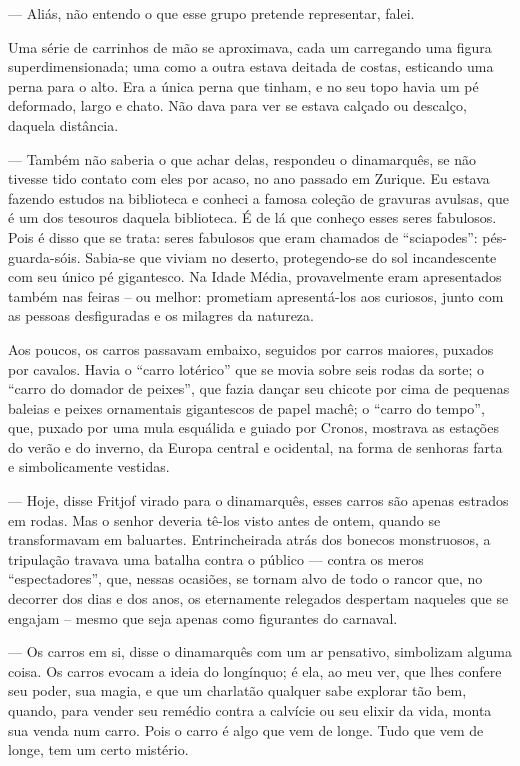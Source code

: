 --- Aliás, não entendo o que esse grupo pretende representar, falei.

Uma série de carrinhos de mão se aproximava, cada um carregando uma
figura superdimensionada; uma como a outra estava deitada de costas,
esticando uma perna para o alto. Era a única perna que tinham, e no seu
topo havia um pé deformado, largo e chato. Não dava para ver se estava
calçado ou descalço, daquela distância.

--- Também não saberia o que achar delas, respondeu o dinamarquês, se não
tivesse tido contato com eles por acaso, no ano passado em Zurique. Eu
estava fazendo estudos na biblioteca e conheci a famosa coleção de
gravuras avulsas, que é um dos tesouros daquela biblioteca. É de lá que
conheço esses seres fabulosos. Pois é disso que se trata: seres
fabulosos que eram chamados de ``sciapodes'': pés-guarda-sóis. Sabia-se
que viviam no deserto, protegendo-se do sol incandescente com seu único
pé gigantesco. Na Idade Média, provavelmente eram apresentados também
nas feiras -- ou melhor: prometiam apresentá-los aos curiosos, junto com
as pessoas desfiguradas e os milagres da natureza.

Aos poucos, os carros passavam embaixo, seguidos por carros maiores,
puxados por cavalos. Havia o ``carro lotérico'' que se movia sobre seis
rodas da sorte; o ``carro do domador de peixes'', que fazia dançar seu
chicote por cima de pequenas baleias e peixes ornamentais gigantescos de
papel machê; o ``carro do tempo'', que, puxado por uma mula esquálida e
guiado por Cronos, mostrava as estações do verão e do inverno, da Europa
central e ocidental, na forma de senhoras farta e simbolicamente
vestidas.

--- Hoje, disse Fritjof virado para o dinamarquês, esses carros são
apenas estrados em rodas. Mas o senhor deveria tê-los visto antes de
ontem, quando se transformavam em baluartes. Entrincheirada atrás dos
bonecos monstruosos, a tripulação travava uma batalha contra o público
--- contra os meros ``espectadores'', que, nessas ocasiões, se tornam
alvo de todo o rancor que, no decorrer dos dias e dos anos, os
eternamente relegados despertam naqueles que se engajam -- mesmo que
seja apenas como figurantes do carnaval.

--- Os carros em si, disse o dinamarquês com um ar pensativo, simbolizam
alguma coisa. Os carros evocam a ideia do longínquo; é ela, ao meu ver,
que lhes confere seu poder, sua magia, e que um charlatão qualquer sabe
explorar tão bem, quando, para vender seu remédio contra a calvície ou
seu elixir da vida, monta sua venda num carro. Pois o carro é algo que
vem de longe. Tudo que vem de longe, tem um certo mistério.

